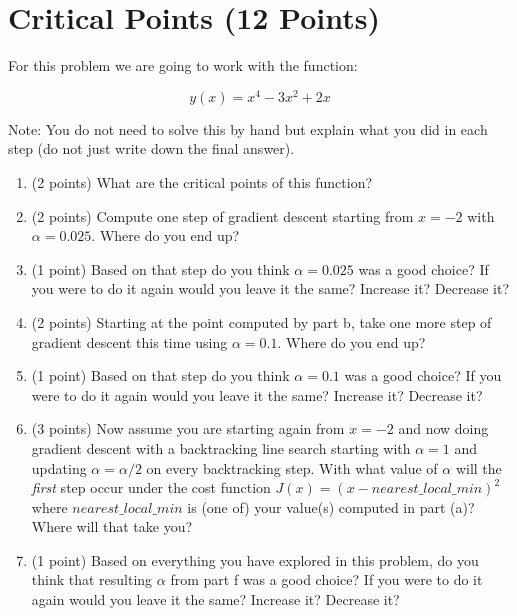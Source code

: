\documentclass[]{article}
\begin{document}
\section{Critical Points (12 Points)}
For this problem we are going to work with the function:
\begin{tcolorbox}[left=14pt, arc=0pt, outer arc=0pt, colframe=blue!5, colback=blue!5]
$$y(x) = x^4 - 3x^2 + 2x$$
\end{tcolorbox}
Note: You do not need to solve this by hand but explain what you did in each step (do not just write down the final answer).
\begin{enumerate}[label=(\alph*)]
    \item (2 points) What are the critical points of this function?
    \item (2 points) Compute one step of gradient descent starting from $x=-2$ with $\alpha = 0.025$. Where do you end up?
    \item (1 point) Based on that step do you think $\alpha = 0.025$ was a good choice? If you were to do it again would you leave it the same? Increase it? Decrease it?
    \item (2 points) Starting at the point computed by part b, take one more step of gradient descent this time using $\alpha = 0.1$. Where do you end up?
    \item (1 point) Based on that step do you think $\alpha = 0.1$ was a good choice? If you were to do it again would you leave it the same? Increase it? Decrease it?
    \item (3 points) Now assume you are starting again from $x=-2$ and now doing gradient descent with a backtracking line search starting with $\alpha = 1$ and updating $\alpha = \alpha / 2$ on every backtracking step. With what value of $\alpha$ will the \textit{first} step occur under the cost function $J(x) = (x - nearest\_local\_min)^2$ where $nearest\_local\_min$ is (one of) your value(s) computed in part (a)? Where will that take you?
    \item (1 point) Based on everything you have explored in this problem, do you think that resulting $\alpha$ from part f was a good choice? If you were to do it again would you leave it the same? Increase it? Decrease it?
\end{enumerate}
\end{document}

